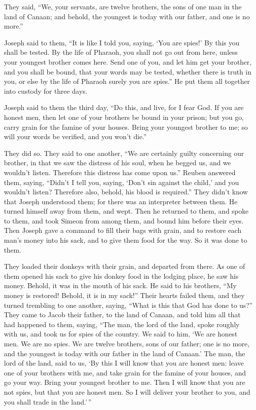  They said, ``We, your servants, are twelve brothers, the
sons of one man in the land of Canaan; and behold, the youngest is today
with our father, and one is no more.''

 Joseph said to them, ``It is like I told you, saying, `You
are spies!'  By this you shall be tested. By the life of
Pharaoh, you shall not go out from here, unless your youngest brother
comes here.  Send one of you, and let him get your brother,
and you shall be bound, that your words may be tested, whether there is
truth in you, or else by the life of Pharaoh surely you are spies.''
 He put them all together into custody for three days.

 Joseph said to them the third day, ``Do this, and live,
for I fear God.  If you are honest men, then let one of
your brothers be bound in your prison; but you go, carry grain for the
famine of your houses.  Bring your youngest brother to me;
so will your words be verified, and you won't die.''

They did so.  They said to one another, ``We are certainly
guilty concerning our brother, in that we saw the distress of his soul,
when he begged us, and we wouldn't listen. Therefore this distress has
come upon us.''  Reuben answered them, saying, ``Didn't I
tell you, saying, `Don't sin against the child,' and you wouldn't
listen? Therefore also, behold, his blood is required.'' 
They didn't know that Joseph understood them; for there was an
interpreter between them.  He turned himself away from
them, and wept. Then he returned to them, and spoke to them, and took
Simeon from among them, and bound him before their eyes. 
Then Joseph gave a command to fill their bags with grain, and to restore
each man's money into his sack, and to give them food for the way. So it
was done to them.

 They loaded their donkeys with their grain, and departed
from there.  As one of them opened his sack to give his
donkey food in the lodging place, he saw his money. Behold, it was in
the mouth of his sack.  He said to his brothers, ``My money
is restored! Behold, it is in my sack!'' Their hearts failed them, and
they turned trembling to one another, saying, ``What is this that God
has done to us?''  They came to Jacob their father, to the
land of Canaan, and told him all that had happened to them, saying,
 ``The man, the lord of the land, spoke roughly with us,
and took us for spies of the country.  We said to him, `We
are honest men. We are no spies.  We are twelve brothers,
sons of our father; one is no more, and the youngest is today with our
father in the land of Canaan.'  The man, the lord of the
land, said to us, `By this I will know that you are honest men: leave
one of your brothers with me, and take grain for the famine of your
houses, and go your way.  Bring your youngest brother to
me. Then I will know that you are not spies, but that you are honest
men. So I will deliver your brother to you, and you shall trade in the
land.'\,''

